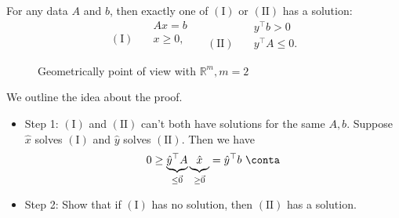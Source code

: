 \begin{lemma}\label{lma:Farkas}
	For any data \(A\) and \(b\), then exactly one of \((\mathrm{I})\) or \((\mathrm{II})\) has a solution:
	\[
		\begin{aligned}
			                   & Ax = b   \\
			(\mathrm{I}) \quad & x\geq 0, \\
		\end{aligned}\quad
		\begin{aligned}
			                    & y^{\top}b > 0    \\
			(\mathrm{II}) \quad & y^{\top}A\leq 0.
		\end{aligned}
	\]
\end{lemma}

\begin{figure}[H]
	\centering
	\caption{Geometrically point of view with \(\mathbb{R}^m, m = 2\) }
	\label{fig:Farkas-lemma}
\end{figure}

\begin{intuition}
	We outline the idea about the proof.
	\begin{itemize}
		\item Step 1: \((\mathrm{I})\) and \((\mathrm{II})\) can't both have solutions for the same \(A, b\). Suppose \(\hat{x}\) solves \((\mathrm{I})\) and \(\hat{y}\) solves \((\mathrm{II})\). Then we have
		      \[
			      0\geq \underbrace{\hat{y}^{\top} A}_{\leq \vec{0}} \underbrace{\vphantom{\hat{y}^{\top}A} \hat{x}}_{\geq \vec{0}} = \hat{y}^{\top} b\ \conta
		      \]
		\item Step 2: Show that if \((\mathrm{I})\) has no solution, then \((\mathrm{II})\) has a solution.
	\end{itemize}
\end{intuition}